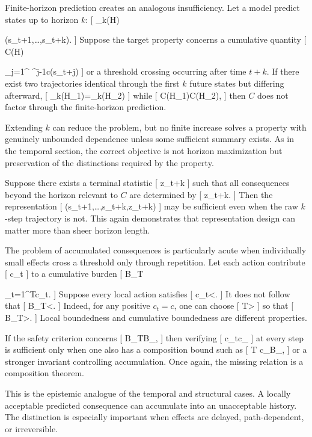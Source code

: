 \documentclass[11pt]{article}
\begin{document}
Finite-horizon prediction creates an analogous insufficiency. Let a model predict states up to horizon $k$:
[
\pi_k(H)

(s_{t+1},\ldots,s_{t+k}).
]
Suppose the target property concerns a cumulative quantity
[
C(H)

\sum_{j=1}^{\infty}
\gamma^{j-1}c(s_{t+j})
]
or a threshold crossing occurring after time $t+k$. If there exist two trajectories identical through the first $k$ future states but differing afterward,
[
\pi_k(H_1)=\pi_k(H_2)
]
while
[
C(H_1)\neq C(H_2),
]
then $C$ does not factor through the finite-horizon prediction.

Extending $k$ can reduce the problem, but no finite increase solves a property with genuinely unbounded dependence unless some sufficient summary exists. As in the temporal section, the correct objective is not horizon maximization but preservation of the distinctions required by the property.

Suppose there exists a terminal statistic
[
z_{t+k}
]
such that all consequences beyond the horizon relevant to $C$ are determined by
[
z_{t+k}.
]
Then the representation
[
(s_{t+1},\ldots,s_{t+k},z_{t+k})
]
may be sufficient even when the raw $k$-step trajectory is not. This again demonstrates that representation design can matter more than sheer horizon length.

The problem of accumulated consequences is particularly acute when individually small effects cross a threshold only through repetition. Let each action contribute
[
c_t
]
to a cumulative burden
[
B_T

\sum_{t=1}^{T}c_t.
]
Suppose every local action satisfies
[
c_t<\tau.
]
It does not follow that
[
B_T<\tau.
]
Indeed, for any positive $c_t=c$, one can choose
[
T>
]
so that
[
B_T>\tau.
]
Local boundedness and cumulative boundedness are different properties.

If the safety criterion concerns
[
B_T\leq B_{\max},
]
then verifying
[
c_t\leq c_{\max}
]
at every step is sufficient only when one also has a composition bound such as
[
T c_{\max}\leq B_{\max},
]
or a stronger invariant controlling accumulation. Once again, the missing relation is a composition theorem.

This is the epistemic analogue of the temporal and structural cases. A locally acceptable predicted consequence can accumulate into an unacceptable history. The distinction is especially important when effects are delayed, path-dependent, or irreversible.
\end{document}
